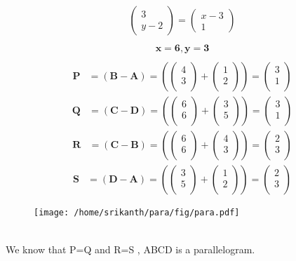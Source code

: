 \documentclass[12pt]{article}
\providecommand{\brak}[1]{\ensuremath{\left(#1\right)}}
\newcommand{\myvec}[1]{\ensuremath{\begin{pmatrix}#1\end{pmatrix}}}
\let\vec\mathbf
\begin{document}
 \begin{align} 
 \myvec{3\\y-2}=\myvec{x-3\\1}\\
 \end{align}
 \begin{align} 
 \vec{x=6},\vec{y=3}\\
 \end{align}
 \begin{align}
 \vec{P} &= \brak{\vec{B}-\vec{A}} = \brak{\myvec{
  4 \\
  3 \\
 } + \myvec{
  1 \\
  2\\
 } 
 } = \myvec{
 3\\
 1\\
 }  
 \end{align}
 \begin{align}
 \vec{Q} &= \brak{\vec{C}-\vec{D}} = \brak{\myvec{
  6 \\
  6 \\
 } + \myvec{
  3 \\
  5\\
 } 
 } = \myvec{
 3\\
 1\\
 }
 \end{align}
 \begin{align}
 \vec{R} &= \brak{\vec{C}-\vec{B}} = \brak{\myvec{
  6 \\
  6 \\
 } + \myvec{
  4 \\
  3\\
 } 
 } = \myvec{
 2\\
 3\\
 } 
 \end{align}
 \begin{align}
 \vec{S} &= \brak{\vec{D}-\vec{A}} = \brak{\myvec{
  3 \\
  5 \\
 } + \myvec{
  1 \\
  2\\
 } 
 } = \myvec{
 2\\
 3\\
 } 
\end{align}
\begin{figure}[h!]
	\begin{center}
  \texttt{[image: /home/srikanth/para/fig/para.pdf]}
	\end{center}
\caption{}
\label{fig:Fig3}
\end{figure}\\
We know that P=Q and R=S , ABCD is a parallelogram. 
\
\end{document}
